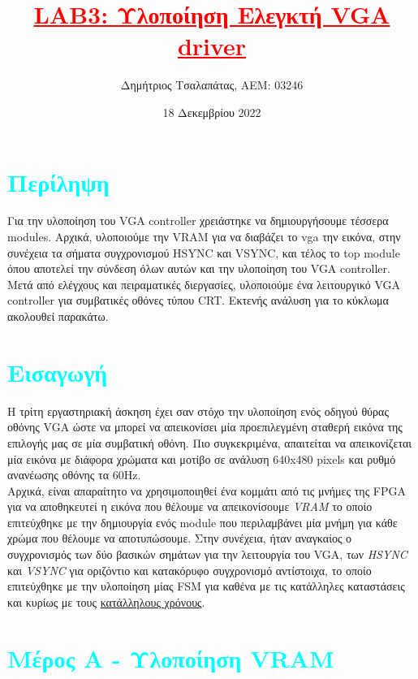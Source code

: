 \documentclass[12pt,a4paper]{article}
\title{\textbf{\textcolor{red}{\underline{LAB3: Υλοποίηση Ελεγκτή VGA driver}} } }
\author{Δημήτριος Τσαλαπάτας, ΑΕΜ: 03246}
\date{18 Δεκεμβρίου 2022}
\begin{document}
	\maketitle
	\tableofcontents
	\newpage
	\section{\textcolor{cyan}{Περίληψη} }
	Για την υλοποίηση του VGA controller χρειάστηκε να δημιουργήσουμε τέσσερα modules. Αρχικά, υλοποιούμε την VRAM για να διαβάζει το vga την εικόνα, στην συνέχεια τα σήματα συγχρονισμού HSYNC και VSYNC, και τέλος το top module όπου αποτελεί την σύνδεση όλων αυτών και την υλοποίηση του VGA controller. Μετά από ελέγχους και πειραματικές διεργασίες, υλοποιούμε ένα λειτουργικό VGA controller για συμβατικές οθόνες τύπου CRT. Εκτενής ανάλυση για το κύκλωμα ακολουθεί παρακάτω.
	
	\section{\textcolor{cyan}{Εισαγωγή} }
	Η τρίτη εργαστηριακή άσκηση έχει σαν στόχο την υλοποίηση ενός οδηγού θύρας οθόνης VGA ώστε να μπορεί να απεικονίσει μία προεπιλεγμένη σταθερή εικόνα της επιλογής μας σε μία συμβατική οθόνη. Πιο συγκεκριμένα, απαιτείται να απεικονίζεται μία εικόνα με διάφορα χρώματα και μοτίβο σε ανάλυση 640x480 pixels και ρυθμό ανανέωσης οθόνης τα 60Hz.\\
	Αρχικά, είναι απαραίτητο να χρησιμοποιηθεί ένα κομμάτι από τις μνήμες της FPGA για να αποθηκευτεί η εικόνα που θέλουμε να απεικονίσουμε \emph{VRAM} το οποίο επιτεύχθηκε με την δημιουργία ενός module που περιλαμβάνει μία μνήμη για κάθε χρώμα που θέλουμε να αποτυπώσουμε. Στην συνέχεια, ήταν αναγκαίος ο συγχρονισμός των δύο βασικών σημάτων για την λειτουργία του VGA, των \emph{HSYNC} και \emph{VSYNC} για οριζόντιο και κατακόρυφο συγχρονισμό αντίστοιχα, το οποίο επιτεύχθηκε με την υλοποίηση μίας FSM για καθένα με τις κατάλληλες καταστάσεις και κυρίως με τους \underline{κατάλληλους χρόνους}.

	
	\section{\textcolor{cyan}{Μέρος Α - Υλοποίηση VRAM}}
\end{document}
